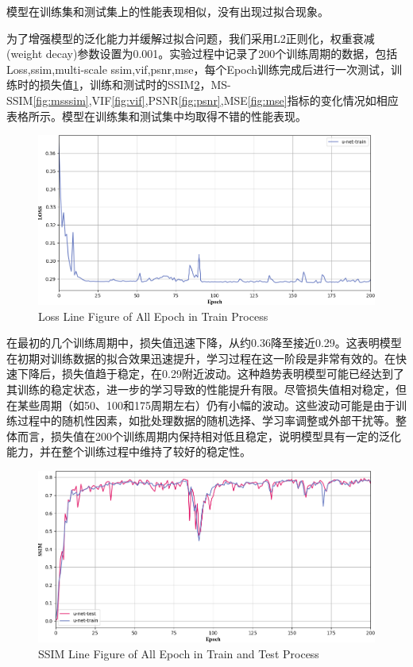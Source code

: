 \documentclass[twocolumn]{article}
\begin{document}
模型在训练集和测试集上的性能表现相似，没有出现过拟合现象。

为了增强模型的泛化能力并缓解过拟合问题，我们采用L2正则化，权重衰减(weight decay)参数设置为0.001。实验过程中记录了200个训练周期的数据，包括Loss,ssim,multi-scale ssim,vif,psnr,mse，每个Epoch训练完成后进行一次测试，训练时的损失值\ref{fig:loss_train}，训练和测试时的SSIM\ref{fig:ssim}，MS-SSIM\ref{fig:msssim},VIF\ref{fig:vif},PSNR\ref{fig:psnr},MSE\ref{fig:mse}指标的变化情况如相应表格所示。模型在训练集和测试集中均取得不错的性能表现。

\begin{figure}[h]
    \centering
    \includegraphics[width=1.0\linewidth]{u-net/LOSS}
    \caption[loss_train]{Loss Line Figure of All Epoch in Train Process}
    \label{fig:loss_train}
\end{figure}

在最初的几个训练周期中，损失值迅速下降，从约0.36降至接近0.29。这表明模型在初期对训练数据的拟合效果迅速提升，学习过程在这一阶段是非常有效的。在快速下降后，损失值趋于稳定，在0.29附近波动。这种趋势表明模型可能已经达到了其训练的稳定状态，进一步的学习导致的性能提升有限。尽管损失值相对稳定，但在某些周期（如50、100和175周期左右）仍有小幅的波动。这些波动可能是由于训练过程中的随机性因素，如批处理数据的随机选择、学习率调整或外部干扰等。整体而言，损失值在200个训练周期内保持相对低且稳定，说明模型具有一定的泛化能力，并在整个训练过程中维持了较好的稳定性。

\begin{figure}[h]
    \centering
    \includegraphics[width=1.0\linewidth]{u-net/SSIM}
    \caption[ssim]{SSIM Line Figure of All Epoch in Train and Test Process}
    \label{fig:ssim}
\end{figure}
\end{document}
